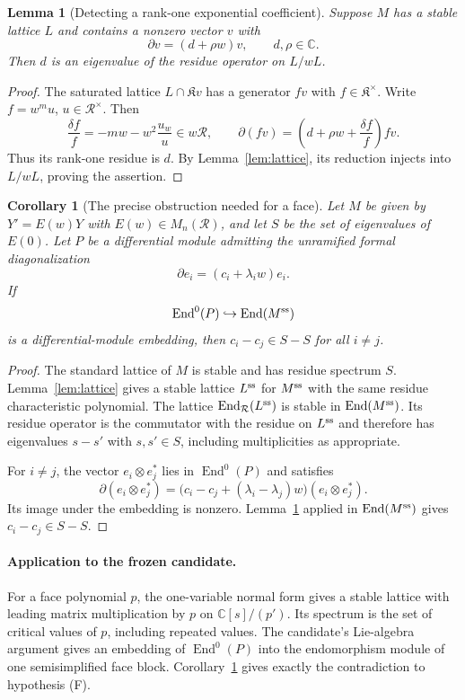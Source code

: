 \documentclass[11pt]{article}
\newtheorem{lemma}[proposition]{Lemma}
\newtheorem{corollary}[proposition]{Corollary}
\newcommand{\C}{\mathbb C}
\newcommand{\K}{\mathfrak K}
\newcommand{\R}{\mathcal R}
\newcommand{\End}{\operatorname{End}}
\begin{document}
\begin{lemma}[Detecting a rank-one exponential coefficient]\label{lem:rankone}
Suppose $M$ has a stable lattice $L$ and contains a nonzero vector $v$ with
\[
 \partial v=(d+\rho w)v,\qquad d,\rho\in\C.
\]
Then $d$ is an eigenvalue of the residue operator on $L/wL$.
\end{lemma}
\begin{proof}
The saturated lattice $L\cap\K v$ has a generator $fv$ with $f\in\K^\times$. Write $f=w^m u$, $u\in\R^\times$. Then
\[
 \frac{\delta f}{f}=-mw-w^2\frac{u_w}{u}\in w\R,
 \qquad
 \partial(fv)=\left(d+\rho w+\frac{\delta f}{f}\right)fv.
\]
Thus its rank-one residue is $d$. By Lemma~\ref{lem:lattice}, its reduction injects into $L/wL$, proving the assertion.
\end{proof}

\begin{corollary}[The precise obstruction needed for a face]\label{cor:face}
Let $M$ be given by $Y'=E(w)Y$ with $E(w)\in M_n(\R)$, and let $S$ be the set of eigenvalues of $E(0)$. Let $P$ be a differential module admitting the unramified formal diagonalization
\[
 \partial e_i=(c_i+\lambda_i w)e_i.
\]
If
\[
 \End^0(P)\hookrightarrow\End(M^{\rm ss})
\]
is a differential-module embedding, then $c_i-c_j\in S-S$ for all $i\ne j$.
\end{corollary}
\begin{proof}
The standard lattice of $M$ is stable and has residue spectrum $S$. Lemma~\ref{lem:lattice} gives a stable lattice $L^{\rm ss}$ for $M^{\rm ss}$ with the same residue characteristic polynomial. The lattice
$\End_{\R}(L^{\rm ss})$ is stable in $\End(M^{\rm ss})$. Its residue operator is the commutator with the residue on $L^{\rm ss}$ and therefore has eigenvalues $s-s'$ with $s,s'\in S$, including multiplicities as appropriate.

For $i\ne j$, the vector $e_i\otimes e_j^*$ lies in $\End^0(P)$ and satisfies
\[
 \partial(e_i\otimes e_j^*)=
 \bigl(c_i-c_j+(\lambda_i-\lambda_j)w\bigr)(e_i\otimes e_j^*).
\]
Its image under the embedding is nonzero. Lemma~\ref{lem:rankone} applied in $\End(M^{\rm ss})$ gives $c_i-c_j\in S-S$.
\end{proof}

\paragraph{Application to the frozen candidate.}
For a face polynomial $p$, the one-variable normal form gives a stable lattice with leading matrix multiplication by $p$ on $\C[s]/(p')$. Its spectrum is the set of critical values of $p$, including repeated values. The candidate's Lie-algebra argument gives an embedding of $\End^0(P)$ into the endomorphism module of one semisimplified face block. Corollary~\ref{cor:face} gives exactly the contradiction to hypothesis (F).
\end{document}
